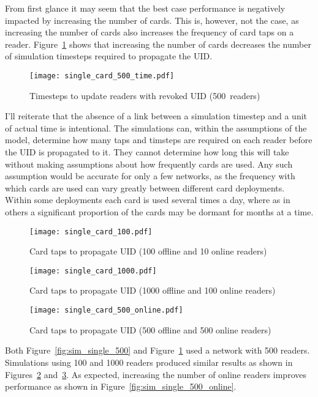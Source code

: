 \documentclass[dissertation.tex]{subfiles}
\begin{document}
  From first glance it may seem that the best case performance is negatively impacted by increasing the number of cards. This is, however, not the case, as increasing the number of cards also increases the frequency of card taps on a reader. Figure~\ref{fig:sim_single_500_time} shows that increasing the number of cards decreases the number of simulation timesteps required to propagate the UID.\@

  \begin{figure}[h]
    \centering
    \texttt{[image: single\_card\_500\_time.pdf]}
    \caption{Timesteps to update readers with revoked UID (\SI{500}{readers})}\label{fig:sim_single_500_time}
  \end{figure}

  I'll reiterate that the absence of a link between a simulation timestep and a unit of actual time is intentional. The simulations can, within the assumptions of the model, determine how many taps and timsteps are required on each reader before the UID is propagated to it. They cannot determine how long this will take without making assumptions about how frequently cards are used. Any such assumption would be accurate for only a few networks, as the frequency with which cards are used can vary greatly between different card deployments. Within some deployments each card is used several times a day, where as in others a significant proportion of the cards may be dormant for months at a time.

  \begin{figure}[p]
    \centering
    \texttt{[image: single\_card\_100.pdf]}
    \caption{Card taps to propagate UID (100 offline and 10 online readers)}\label{fig:sim_single_100}
  \end{figure}
  \begin{figure}[p]
    \centering
    \texttt{[image: single\_card\_1000.pdf]}
    \caption{Card taps to propagate UID (1000 offline and 100 online readers)}\label{fig:sim_single_1000}
  \end{figure}
  \begin{figure}[p]
    \centering
    \texttt{[image: single\_card\_500\_online.pdf]}
    \caption{Card taps to propagate UID (500 offline and 500 online readers)}\label{fig:sim_single_500_online}
  \end{figure}

  Both Figure~\ref{fig:sim_single_500} and Figure~\ref{fig:sim_single_500_time} used a network with 500 readers. Simulations using 100 and 1000 readers produced similar results as shown in Figures~\ref{fig:sim_single_100} and~\ref{fig:sim_single_1000}. As expected, increasing the number of online readers improves performance as shown in Figure~\vref{fig:sim_single_500_online}.
\end{document}
